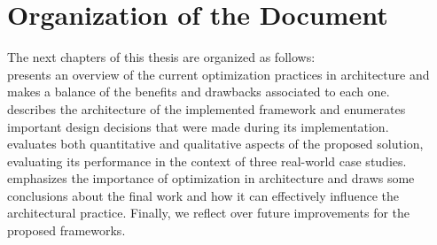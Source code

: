 \section{Organization of the Document}
The next chapters of this thesis are organized as follows: \\ 
\textbf{} presents an overview of the current optimization practices in architecture and makes a balance of the benefits and drawbacks associated to each one.  \\
\textbf{} describes the architecture of the implemented framework and enumerates important design decisions that were made during its implementation. \\
\textbf{} evaluates both quantitative and qualitative aspects of the proposed solution, evaluating its performance in the context of three real-world case studies. \\
\textbf{} emphasizes the importance of optimization in architecture and draws some conclusions about the final work and how it can effectively influence the architectural practice. Finally, we reflect over future improvements for the proposed frameworks. \\
